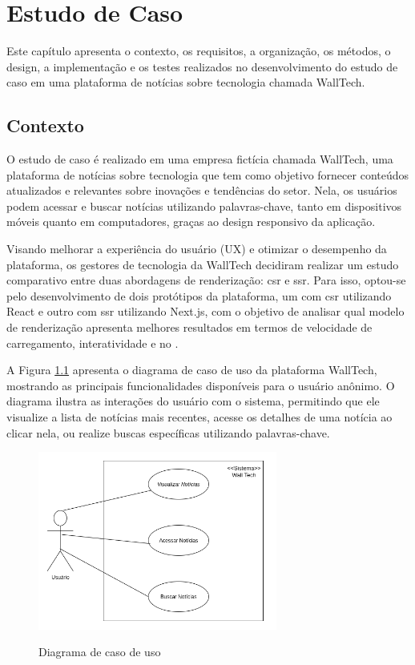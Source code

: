 \chapter{Estudo de Caso }
\label{cap:estudo_caso}
Este capítulo apresenta o contexto, os requisitos, a organização, os métodos, o design, a implementação e os testes realizados no desenvolvimento do estudo de caso em uma plataforma de notícias sobre tecnologia chamada WallTech.

\section{Contexto}
\label{section:contexto}
O estudo de caso é realizado em uma empresa fictícia chamada WallTech, uma plataforma de notícias sobre tecnologia que tem como objetivo fornecer conteúdos atualizados e relevantes sobre inovações e tendências do setor. Nela, os usuários podem acessar e buscar notícias utilizando palavras-chave, tanto em dispositivos móveis quanto em computadores, graças ao design responsivo da aplicação.  

Visando melhorar a experiência do usuário (UX) e otimizar o desempenho da plataforma, os gestores de tecnologia da WallTech decidiram realizar um estudo comparativo entre duas abordagens de renderização: \acrfull{csr} e \acrfull{ssr}. Para isso, optou-se pelo desenvolvimento de dois protótipos da plataforma, um com \acrshort{csr} utilizando React e outro com \acrshort{ssr} utilizando Next.js, com o objetivo de analisar qual modelo de renderização apresenta melhores resultados em termos de velocidade de carregamento, interatividade e no .

A Figura \ref{fig:caso-uso-walltech} apresenta o diagrama de caso de uso da plataforma WallTech, mostrando as principais funcionalidades disponíveis para o usuário anônimo. O diagrama ilustra as interações do usuário com o sistema, permitindo que ele visualize a lista de notícias mais recentes, acesse os detalhes de uma notícia ao clicar nela, ou realize buscas específicas utilizando palavras-chave.  

\begin{figure}[H]
  \centering
  \caption{Diagrama de caso de uso}
  \includegraphics[width=0.7\textwidth]{media/wall_tech_use_case.png}
  \label{fig:caso-uso-walltech}
\end{figure}



